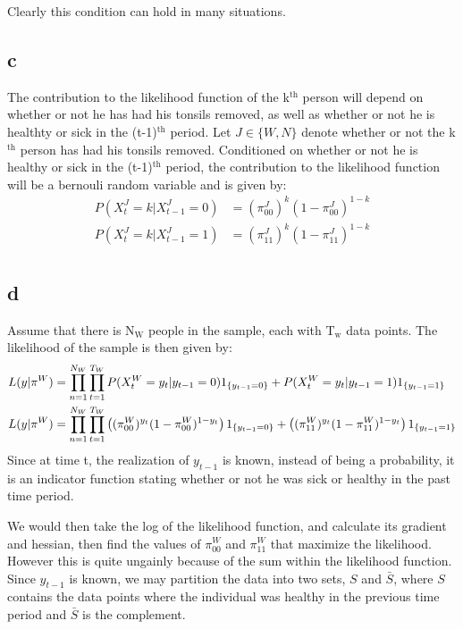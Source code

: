 \documentclass[11pt]{article}
\begin{document}
Clearly this condition can hold in many situations.

\subsection{c}
\label{sec-1-3}
The contribution to the likelihood function of the k$^{\text{th}}$ person will
depend on whether or not he has had his tonsils removed, as well as
whether or not he is healthty or sick in the (t-1)$^{\text{th}}$ period. Let $J \in
\{W,N\}$ denote whether or not the k$^{\text{th}}$ person has had his tonsils
removed. Conditioned on whether or not he is healthy or sick in the
(t-1)$^{\text{th}}$ period, the contribution to the likelihood function will be a
bernouli random variable and is given by:
\begin{align*}
P( X_t^J = k | X_{t-1}^J = 0 ) &= (\pi_{00}^J)^k (1 - \pi_{00}^J)^{1-k} \\
P( X_t^J = k | X_{t-1}^J = 1 ) &= (\pi_{11}^J)^k (1-\pi_{11}^J)^{1-k} \\
\end{align*}

\subsection{d}
\label{sec-1-4}
Assume that there is N$_{\text{W}}$ people in the sample, each with T$_{\text{w}}$ data
points. The likelihood of the sample is then given by:
\begin{align*}
L( y | \bold{\pi}^W ) &= \prod_{n = 1}^{N_W} \prod_{t=1}^{T_W} P( X_t^W = y_t | y_{t-1} = 0 )
1_{\{y_{t-1} = 0\}} + P( X_t^W = y_t | y_{t-1} = 1 ) 1_{\{y_{t-1} = 1\}} \\
L( y | \bold{\pi}^W ) &= \prod_{n = 1}^{N_W} \prod_{t=1}^{T_W} \left ( (\pi_{00}^W)^{y_t} (1 - \pi_{00}^W)^{1-y_t} \right )
1_{\{y_{t-1} = 0\}} + \left ((\pi_{11}^W)^{y_t} (1-\pi_{11}^W)^{1-y_t} \right )1_{\{y_{t-1} = 1\}} \\
\end{align*}
Since at time t, the realization of $y_{t-1}$ is known, instead of being
a probability, it is an indicator function stating whether or not he
was sick or healthy in the past time period.

We would then take the log of the likelihood function, and calculate
its gradient and hessian, then find the values of $\pi_{00}^W$ and $\pi_{11}^W$
that maximize the likelihood. However this is quite ungainly because
of the sum within the likelihood function. Since $y_{t-1}$ is known, we
may partition the data into two sets, $S$ and $\bar{S}$, where $S$
contains the data points where the individual was healthy in the
previous time period and $\bar{S}$ is the complement.
\end{document}
